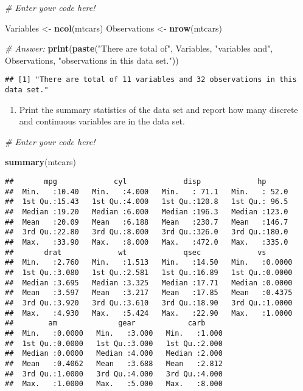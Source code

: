 \documentclass[
]{article}
\newenvironment{Shaded}{\begin{snugshade}}{\end{snugshade}}
\newcommand{\CommentTok}[1]{\textcolor[rgb]{0.56,0.35,0.01}{\textit{#1}}}
\newcommand{\FunctionTok}[1]{\textcolor[rgb]{0.13,0.29,0.53}{\textbf{#1}}}
\newcommand{\NormalTok}[1]{#1}
\newcommand{\OtherTok}[1]{\textcolor[rgb]{0.56,0.35,0.01}{#1}}
\newcommand{\StringTok}[1]{\textcolor[rgb]{0.31,0.60,0.02}{#1}}
\providecommand{\tightlist}{%
  \setlength{\itemsep}{0pt}\setlength{\parskip}{0pt}}
\begin{document}
\begin{Shaded}
\begin{Highlighting}[]
\CommentTok{\# Enter your code here!}

\NormalTok{Variables }\OtherTok{\textless{}{-}} \FunctionTok{ncol}\NormalTok{(mtcars)}
\NormalTok{Observations }\OtherTok{\textless{}{-}} \FunctionTok{nrow}\NormalTok{(mtcars)}

\CommentTok{\# Answer:}
\FunctionTok{print}\NormalTok{(}\FunctionTok{paste}\NormalTok{(}\StringTok{"There are total of"}\NormalTok{, Variables, }\StringTok{"variables and"}\NormalTok{, Observations, }\StringTok{"observations in this data set."}\NormalTok{))}
\end{Highlighting}
\end{Shaded}

\begin{verbatim}
## [1] "There are total of 11 variables and 32 observations in this data set."
\end{verbatim}

\begin{enumerate}
\def\labelenumi{\alph{enumi}.}
\setcounter{enumi}{1}
\tightlist
\item
  Print the summary statistics of the data set and report how many
  discrete and continuous variables are in the data set.
\end{enumerate}

\begin{Shaded}
\begin{Highlighting}[]
\CommentTok{\# Enter your code here!}

\FunctionTok{summary}\NormalTok{(mtcars)}
\end{Highlighting}
\end{Shaded}

\begin{verbatim}
##       mpg             cyl             disp             hp       
##  Min.   :10.40   Min.   :4.000   Min.   : 71.1   Min.   : 52.0  
##  1st Qu.:15.43   1st Qu.:4.000   1st Qu.:120.8   1st Qu.: 96.5  
##  Median :19.20   Median :6.000   Median :196.3   Median :123.0  
##  Mean   :20.09   Mean   :6.188   Mean   :230.7   Mean   :146.7  
##  3rd Qu.:22.80   3rd Qu.:8.000   3rd Qu.:326.0   3rd Qu.:180.0  
##  Max.   :33.90   Max.   :8.000   Max.   :472.0   Max.   :335.0  
##       drat             wt             qsec             vs        
##  Min.   :2.760   Min.   :1.513   Min.   :14.50   Min.   :0.0000  
##  1st Qu.:3.080   1st Qu.:2.581   1st Qu.:16.89   1st Qu.:0.0000  
##  Median :3.695   Median :3.325   Median :17.71   Median :0.0000  
##  Mean   :3.597   Mean   :3.217   Mean   :17.85   Mean   :0.4375  
##  3rd Qu.:3.920   3rd Qu.:3.610   3rd Qu.:18.90   3rd Qu.:1.0000  
##  Max.   :4.930   Max.   :5.424   Max.   :22.90   Max.   :1.0000  
##        am              gear            carb      
##  Min.   :0.0000   Min.   :3.000   Min.   :1.000  
##  1st Qu.:0.0000   1st Qu.:3.000   1st Qu.:2.000  
##  Median :0.0000   Median :4.000   Median :2.000  
##  Mean   :0.4062   Mean   :3.688   Mean   :2.812  
##  3rd Qu.:1.0000   3rd Qu.:4.000   3rd Qu.:4.000  
##  Max.   :1.0000   Max.   :5.000   Max.   :8.000
\end{verbatim}
\end{document}
